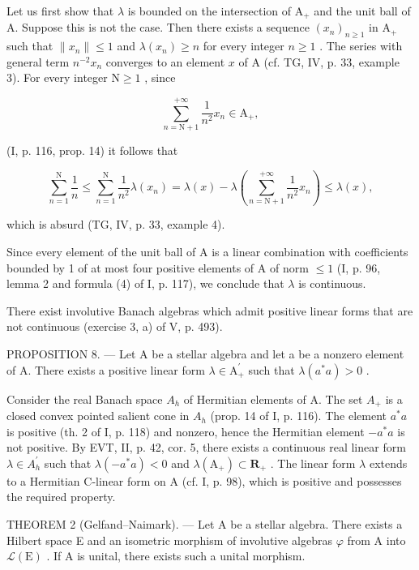 Let us first show that \(\lambda\) is bounded on the intersection of \(\mathrm{A}_{+}\) and the unit ball of A. Suppose this is not the case. Then there exists a sequence \((x_{n})_{n\geqslant 1}\) in \(\mathrm{A}_{+}\) such that \(\| x_n\| \leqslant 1\) and \(\lambda (x_n)\geqslant n\) for every integer \(n\geqslant 1\) . The series with general term \(n^{-2}x_{n}\) converges to an element \(x\) of A (cf. TG, IV, p. 33, example 3). For every integer \(\mathrm{N}\geqslant 1\) , since

\[
\sum_ {n = \mathrm{N} + 1} ^ {+ \infty} \frac {1}{n ^ {2}} x _ {n} \in \mathrm{A} _ {+},
\]

(I, p. 116, prop. 14) it follows that

\[
\sum_ {n = 1} ^ {\mathrm{N}} \frac {1}{n} \leqslant \sum_ {n = 1} ^ {\mathrm{N}} \frac {1}{n ^ {2}} \lambda (x _ {n}) = \lambda (x) - \lambda \left(\sum_ {n = \mathrm{N} + 1} ^ {+ \infty} \frac {1}{n ^ {2}} x _ {n}\right) \leqslant \lambda (x),
\]

which is absurd (TG, IV, p. 33, example 4).

Since every element of the unit ball of A is a linear combination with coefficients bounded by 1 of at most four positive elements of A of norm \(\leqslant 1\) (I, p. 96, lemma 2 and formula (4) of I, p. 117), we conclude that \(\lambda\) is continuous.

There exist involutive Banach algebras which admit positive linear forms that are not continuous (exercise 3, a) of V, p. 493).

PROPOSITION 8. --- Let A be a stellar algebra and let a be a nonzero element of A. There exists a positive linear form \(\lambda \in \mathrm{A}_{+}^{\prime}\) such that \(\lambda(a^{*}a) > 0\) .

Consider the real Banach space \(A_{h}\) of Hermitian elements of A. The set \(A_{+}\) is a closed convex pointed salient cone in \(A_{h}\) (prop. 14 of I, p. 116). The element \(a^{*}a\) is positive (th. 2 of I, p. 118) and nonzero, hence the Hermitian element \(-a^{*}a\) is not positive. By EVT, II, p. 42, cor. 5, there exists a continuous real linear form \(\lambda\in A_{h}^{\prime}\) such that \(\lambda(-a^{*}a)<0\) and \(\lambda(\mathrm{A}_{+})\subset\mathbf{R}_{+}\) . The linear form \(\lambda\) extends to a Hermitian C-linear form on A (cf. I, p. 98), which is positive and possesses the required property.

THEOREM 2 (Gelfand--Naimark). --- Let A be a stellar algebra. There exists a Hilbert space E and an isometric morphism of involutive algebras \(\varphi\) from A into \(\mathcal{L}(\mathrm{E})\) . If A is unital, there exists such a unital morphism.


